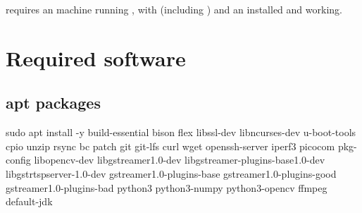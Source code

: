  requires an  machine running , with  (including ) and an  installed and working.

\section{Required software}

\subsection{apt packages}
\label{subsec:fpgalix-apt-packages}

\begin{shellcodehost}
sudo apt install -y build-essential bison flex libssl-dev libncurses-dev u-boot-tools cpio unzip 
    rsync bc patch git git-lfs curl wget openssh-server iperf3 picocom pkg-config libopencv-dev 
    libgstreamer1.0-dev libgstreamer-plugins-base1.0-dev libgstrtspserver-1.0-dev 
    gstreamer1.0-plugins-base gstreamer1.0-plugins-good gstreamer1.0-plugins-bad 
    python3 python3-numpy python3-opencv ffmpeg default-jdk
\end{shellcodehost}

